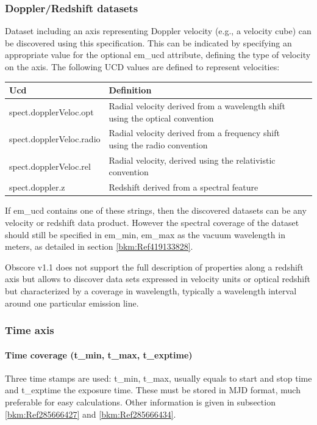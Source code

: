 \documentclass[11pt,a4paper]{ivoa}
\begin{document}
\subsubsection{Doppler/Redshift datasets}
Dataset including an axis representing Doppler velocity (e.g., a velocity cube) can be discovered using this
specification. This can be indicated by specifying an appropriate value for the optional em\_ucd attribute, defining
the type of velocity on the axis. The following UCD values are defined to represent velocities:

\begin{tabular}{|l|p{}|p{}|}
\hline
Ucd & Definition\\\hline
spect.dopplerVeloc.opt & Radial velocity derived from a wavelength shift using the optical convention\\\hline
spect.dopplerVeloc.radio & Radial velocity derived from a frequency shift using the radio convention\\\hline
spect.dopplerVeloc.rel & Radial velocity, derived using the relativistic convention\\\hline
spect.doppler.z & Redshift derived from a spectral feature\\\hline
\end{tabular}
If em\_ucd contains one of these strings, then the discovered datasets can be any velocity or redshift data product. 
However the spectral coverage of the dataset should still be specified in em\_min, em\_max as the vacuum wavelength in
meters, as detailed in section \ref{bkm:Ref419133828}.

Obscore v1.1 does not support the full description of  properties along a redshift axis but allows to discover data sets
expressed in velocity units  or optical redshift but characterized by a coverage in wavelength, typically a wavelength
interval around one particular emission line.

\subsubsection{Time axis}
\paragraph[Time coverage (t\_min, t\_max, t\_exptime)]{Time coverage (t\_min, t\_max, t\_exptime)}
Three time stamps are used: t\_min, t\_max, usually equals to start and stop time and t\_exptime the exposure time.
These must be stored in MJD format, much preferable for easy calculations. Other information is given in subsection 
\ref{bkm:Ref285666427} and \ref{bkm:Ref285666434}.
\end{document}
